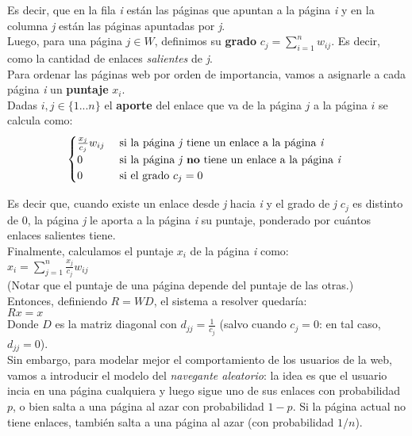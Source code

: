 Es decir, que en la fila \textit{i} están las páginas que apuntan a la página \textit{i} y en la columna \textit{j} están las páginas apuntadas por \textit{j}. \\

Luego, para una página $j \in W$, definimos su \textbf{grado} $c_{j} = \sum_{i = 1}^{n} w_{ij}$. Es decir, como la cantidad de enlaces \textit{salientes} de \textit{j}. \\

Para ordenar las páginas web por orden de importancia, vamos a asignarle a cada página \textit{i} un \textbf{puntaje} $x_i$. \\

Dadas $i, j \in \{1...n\}$ el \textbf{aporte} del enlace que va de la página $j$ a la página $i$ se calcula como: \\

\[
	\begin{cases}
		\frac{x_j}{c_j}w_{ij} 	& \text{ si la página \textit{j} tiene un enlace a la página \textit{i} } \\
		0 			& \text{ si la página \textit{j} \textbf{no} tiene un enlace a la página \textit{i} } \\
		0 			& \text{ si el grado $c_j = 0$}
	\end{cases}
\]

Es decir que, cuando existe un enlace desde \textit{j} hacia \textit{i} y el grado de \textit{j} $c_j$ es distinto de $0$, la página \textit{j} le aporta a la página \textit{i} su puntaje, ponderado por cuántos enlaces salientes tiene. \\

Finalmente, calculamos el puntaje $x_i$ de la página \textit{i} como: \\

$ x_i = \sum_{j=1}^{n} \frac{x_j}{c_j} w_{ij} $ \\

(Notar que el puntaje de una página depende del puntaje de las otras.) \\

Entonces, definiendo $R = WD$, el sistema a resolver quedaría: \\

$Rx = x$ \\

Donde $D$ es la matriz diagonal con $d_{jj} = \frac{1}{c_j}$ (salvo cuando $c_j = 0$: en tal caso, $d_{jj} = 0$). \\

Sin embargo, para modelar mejor el comportamiento de los usuarios de la web, vamos a introducir el modelo del \textit{navegante aleatorio}: la idea es que el usuario incia en una página cualquiera y luego sigue uno de sus enlaces con probabilidad $p$, o bien salta a una página al azar con probabilidad $1 - p$. Si la página actual no tiene enlaces, también salta a una página al azar (con probabilidad $1/n$). \\


